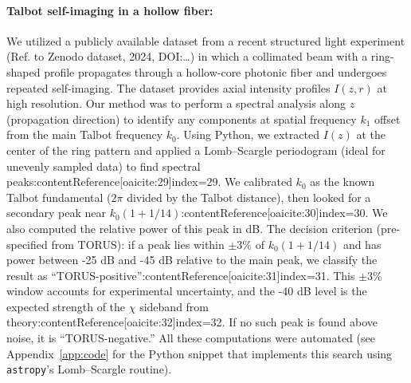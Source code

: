 \documentclass[12pt]{article}
\begin{document}
\paragraph{Talbot self-imaging in a hollow fiber:} We utilized a publicly available dataset from a recent structured light experiment (Ref. to Zenodo dataset, 2024, DOI:…) in which a collimated beam with a ring-shaped profile propagates through a hollow-core photonic fiber and undergoes repeated self-imaging. The dataset provides axial intensity profiles $I(z,r)$ at high resolution. Our method was to perform a spectral analysis along $z$ (propagation direction) to identify any components at spatial frequency $k_1$ offset from the main Talbot frequency $k_0$. Using Python, we extracted $I(z)$ at the center of the ring pattern and applied a Lomb–Scargle periodogram (ideal for unevenly sampled data) to find spectral peaks:contentReference[oaicite:29]{index=29}. We calibrated $k_0$ as the known Talbot fundamental ($2\pi$ divided by the Talbot distance), then looked for a secondary peak near $k_0(1+1/14)$:contentReference[oaicite:30]{index=30}. We also computed the relative power of this peak in dB. The decision criterion (pre-specified from TORUS): if a peak lies within $\pm3\%$ of $k_0(1+1/14)$ and has power between -25 dB and -45 dB relative to the main peak, we classify the result as “TORUS-positive”:contentReference[oaicite:31]{index=31}. This $\pm3\%$ window accounts for experimental uncertainty, and the -40 dB level is the expected strength of the $\chi$ sideband from theory:contentReference[oaicite:32]{index=32}. If no such peak is found above noise, it is “TORUS-negative.” All these computations were automated (see Appendix~\ref{app:code} for the Python snippet that implements this search using \texttt{astropy}’s Lomb–Scargle routine).
\end{document}
